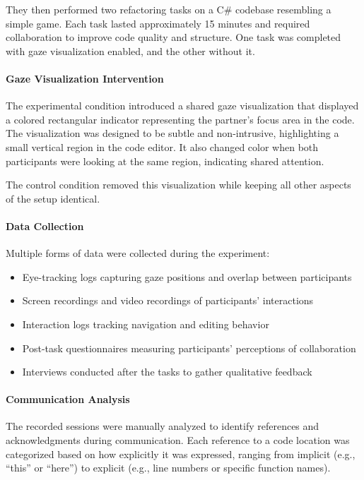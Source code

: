 They then performed two refactoring tasks on a C\# codebase resembling a simple game. Each task lasted approximately 15 minutes and required collaboration to improve code quality and structure. One task was completed with gaze visualization enabled, and the other without it.

\paragraph{Gaze Visualization Intervention}
The experimental condition introduced a shared gaze visualization that displayed a colored rectangular indicator representing the partner’s focus area in the code. The visualization was designed to be subtle and non-intrusive, highlighting a small vertical region in the code editor. It also changed color when both participants were looking at the same region, indicating shared attention.

The control condition removed this visualization while keeping all other aspects of the setup identical.

\paragraph{Data Collection}
Multiple forms of data were collected during the experiment:
\begin{itemize}
    \item Eye-tracking logs capturing gaze positions and overlap between participants
    \item Screen recordings and video recordings of participants’ interactions
    \item Interaction logs tracking navigation and editing behavior
    \item Post-task questionnaires measuring participants’ perceptions of collaboration
    \item Interviews conducted after the tasks to gather qualitative feedback
\end{itemize}

\paragraph{Communication Analysis}
The recorded sessions were manually analyzed to identify references and acknowledgments during communication. Each reference to a code location was categorized based on how explicitly it was expressed, ranging from implicit (e.g., “this” or “here”) to explicit (e.g., line numbers or specific function names).

